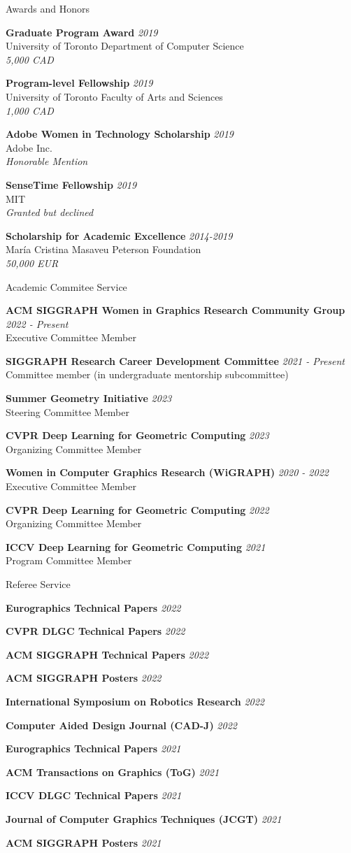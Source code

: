 \documentclass{resume}
\newcommand{\cvitembig}[4]{
    {\bf #1} \hfill {\em \small #2} \\ 
    {\small#3 }\\
    {\it \small #4}
}
\newcommand{\cvitem}[3]{
    {\bf #1} \hfill {\em \small #2} \\ 
    {\small#3 }
}
\newcommand{\cvitemtiny}[2]{
    {\bf #1} \hfill {\em \small #2}
}
\begin{document}
\begin{rSection}{Awards and Honors}
\cvitembig{Graduate Program Award}{2019}{University of Toronto Department of Computer Science}{5,000 CAD}

\cvitembig{Program-level Fellowship}{2019}{University of Toronto Faculty of Arts and Sciences}{1,000 CAD}

\cvitembig{Adobe Women in Technology Scholarship}{2019}{Adobe Inc.}{Honorable Mention}

\cvitembig{SenseTime Fellowship}{2019}{MIT}{Granted but declined}


\cvitembig{ Scholarship for Academic Excellence}{2014-2019}{Mar\'{i}a Cristina Masaveu Peterson Foundation}{50,000 EUR}

\end{rSection}

\begin{rSection}{Academic Commitee Service}

\cvitem{ACM SIGGRAPH Women in Graphics Research Community Group}{2022 - Present}{Executive Committee Member}

\cvitem{SIGGRAPH Research Career Development Committee}{2021 - Present}{Committee member (in undergraduate mentorship subcommittee)}

\cvitem{Summer Geometry Initiative}{2023}{Steering Committee Member}

\cvitem{CVPR Deep Learning for Geometric Computing}{2023}{Organizing Committee Member}

\cvitem{Women in Computer Graphics Research (WiGRAPH)}{2020 - 2022}{Executive Committee Member}

\cvitem{CVPR Deep Learning for Geometric Computing}{2022}{Organizing Committee Member}

\cvitem{ICCV Deep Learning for Geometric Computing}{2021}{Program Committee Member}

\end{rSection}

\begin{rSection}{Referee Service}

\cvitemtiny{Eurographics Technical Papers}{2022}

\cvitemtiny{CVPR DLGC Technical Papers}{2022}

\cvitemtiny{ACM SIGGRAPH Technical Papers}{2022}

\cvitemtiny{ACM SIGGRAPH Posters}{2022}

\cvitemtiny{International Symposium on Robotics Research}{2022}

\cvitemtiny{Computer Aided Design Journal (CAD-J)}{2022}

\cvitemtiny{Eurographics Technical Papers}{2021}

\cvitemtiny{ACM Transactions on Graphics (ToG)}{2021}

\cvitemtiny{ICCV DLGC Technical Papers}{2021}

\cvitemtiny{Journal of Computer Graphics Techniques (JCGT)}{2021}

\cvitemtiny{ACM SIGGRAPH Posters}{2021}

\end{rSection}
\end{document}
